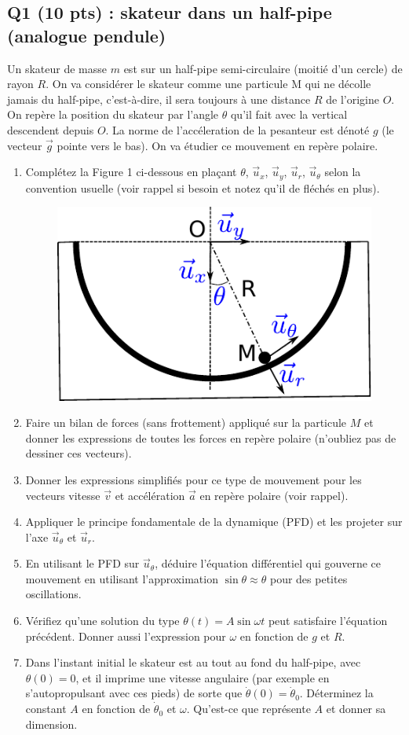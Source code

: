 \documentclass[french,10pt]{article}
\begin{document}
	\subsection*{Q1 (10 pts) : skateur dans un half-pipe (analogue pendule)}
	Un skateur de masse $m$ est sur un half-pipe semi-circulaire (moitié d'un cercle) de rayon $R$. On va considérer le skateur comme une particule M qui ne décolle jamais du half-pipe, c'est-à-dire, il sera toujours à une distance $R$ de l'origine $O$. On repère la position du skateur par l'angle $\theta$ qu'il fait avec la vertical descendent depuis $O$. La norme de l'accéleration de la pesanteur est dénoté $g$ (le vecteur $\Vec{g}$ pointe vers le bas). On va étudier ce mouvement en repère polaire.
	\begin{enumerate}
	\item Complétez la Figure 1 ci-dessous en plaçant $\theta$, $\Vec{u}_x$, $\Vec{u}_y$, $\Vec{u}_r$, $\Vec{u}_\theta$ selon la convention usuelle (voir rappel si besoin et notez qu'il de fléchés en plus).

	\begin{figure}
		\centering
		\includegraphics[width=0.5\linewidth]{halfpipe}
		\caption{}
		\label{fig:halfpipe}
	\end{figure}
	
	
	\item Faire un bilan de forces (sans frottement) appliqué sur la particule $M$ et donner les expressions de toutes les forces en repère polaire (n'oubliez pas de dessiner ces vecteurs).
	\item Donner les expressions simplifiés pour ce type de mouvement pour les vecteurs vitesse $\Vec{v}$ et accélération $\Vec{a}$ en repère polaire (voir rappel).
	\item Appliquer le principe fondamentale de la dynamique (PFD) et les projeter sur l'axe $\Vec{u}_{\theta}$ et $\Vec{u}_{r}$.
	\item En utilisant le PFD sur $\Vec{u}_{\theta}$, déduire l'équation différentiel qui gouverne ce mouvement en utilisant l'approximation $\sin \theta \approx \theta$ pour des petites oscillations.
	\item Vérifiez qu'une solution du type $\theta(t) = A \sin{\omega t}$ peut satisfaire l'équation précédent. Donner aussi l'expression pour $\omega$ en fonction de $g$ et $R$. 
	\item Dans l'instant initial le skateur est au tout au fond du half-pipe, avec $\theta(0) = 0$, et il imprime une vitesse angulaire (par exemple en s'autopropulsant avec ces pieds) de sorte que $\dot{\theta}(0) = \dot{\theta}_0$. Déterminez la constant $A$ en fonction de $\dot{\theta}_0$ et $\omega$. Qu'est-ce que représente $A$ et donner sa dimension. 
	

\end{enumerate}
\end{document}
